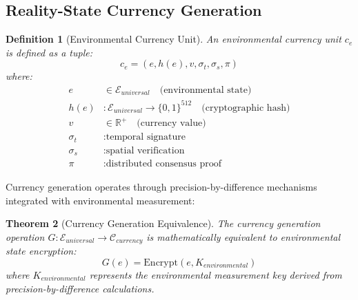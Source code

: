 \documentclass[12pt,a4paper]{article}
\newtheorem{theorem}{Theorem}
\newtheorem{definition}[theorem]{Definition}
\begin{document}
\subsection{Reality-State Currency Generation}

\begin{definition}[Environmental Currency Unit]
An environmental currency unit $c_e$ is defined as a tuple:
\begin{equation}
c_e = (e, h(e), v, \sigma_t, \sigma_s, \pi)
\end{equation}
where:
\begin{align}
e &\in \mathcal{E}_{universal} \quad \text{(environmental state)} \\
h(e) &: \mathcal{E}_{universal} \to \{0,1\}^{512} \quad \text{(cryptographic hash)} \\
v &\in \mathbb{R}^+ \quad \text{(currency value)} \\
\sigma_t &: \text{temporal signature} \\
\sigma_s &: \text{spatial verification} \\
\pi &: \text{distributed consensus proof}
\end{align}
\end{definition}

Currency generation operates through precision-by-difference mechanisms integrated with environmental measurement:

\begin{theorem}[Currency Generation Equivalence]
The currency generation operation $G: \mathcal{E}_{universal} \to \mathcal{C}_{currency}$ is mathematically equivalent to environmental state encryption:
\begin{equation}
G(e) = \text{Encrypt}(e, K_{environmental})
\end{equation}
where $K_{environmental}$ represents the environmental measurement key derived from precision-by-difference calculations.
\end{theorem}
\end{document}
